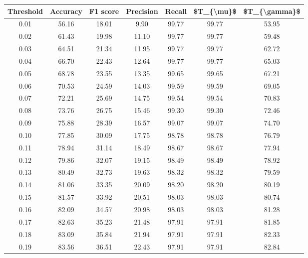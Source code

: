 \begin{tabular}{|c|c|c|c|c|c|c|}
\toprule
 Threshold &  Accuracy &  F1 score &  Precision &  Recall &  \$T\_\{\textbackslash mu\}\$ &  \$T\_\{\textbackslash gamma\}\$ \\
\hline
      0.01 &     56.16 &     18.01 &       9.90 &   99.77 &      99.77 &         53.95 \\
      0.02 &     61.43 &     19.98 &      11.10 &   99.77 &      99.77 &         59.48 \\
      0.03 &     64.51 &     21.34 &      11.95 &   99.77 &      99.77 &         62.72 \\
      0.04 &     66.70 &     22.43 &      12.64 &   99.77 &      99.77 &         65.03 \\
      0.05 &     68.78 &     23.55 &      13.35 &   99.65 &      99.65 &         67.21 \\
      0.06 &     70.53 &     24.59 &      14.03 &   99.59 &      99.59 &         69.05 \\
      0.07 &     72.21 &     25.69 &      14.75 &   99.54 &      99.54 &         70.83 \\
      0.08 &     73.76 &     26.75 &      15.46 &   99.30 &      99.30 &         72.46 \\
      0.09 &     75.88 &     28.39 &      16.57 &   99.07 &      99.07 &         74.70 \\
      0.10 &     77.85 &     30.09 &      17.75 &   98.78 &      98.78 &         76.79 \\
      0.11 &     78.94 &     31.14 &      18.49 &   98.67 &      98.67 &         77.94 \\
      0.12 &     79.86 &     32.07 &      19.15 &   98.49 &      98.49 &         78.92 \\
      0.13 &     80.49 &     32.73 &      19.63 &   98.32 &      98.32 &         79.59 \\
      0.14 &     81.06 &     33.35 &      20.09 &   98.20 &      98.20 &         80.19 \\
      0.15 &     81.57 &     33.92 &      20.51 &   98.03 &      98.03 &         80.74 \\
      0.16 &     82.09 &     34.57 &      20.98 &   98.03 &      98.03 &         81.28 \\
      0.17 &     82.63 &     35.23 &      21.48 &   97.91 &      97.91 &         81.85 \\
      0.18 &     83.09 &     35.84 &      21.94 &   97.91 &      97.91 &         82.33 \\
      0.19 &     83.56 &     36.51 &      22.43 &   97.91 &      97.91 &         82.84 \\

\end{tabular}
